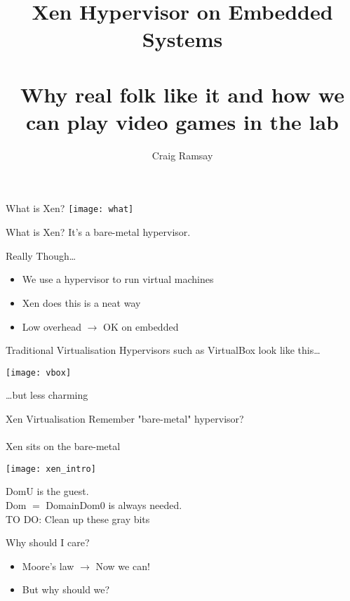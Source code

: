 \documentclass[xelatex]{beamer}
\title{Xen Hypervisor on Embedded Systems\\~\\\normalsize{Why real folk like it and how we can play video games in the lab}}
\author{Craig Ramsay}
\institute{
  Strathclyde University
}
\date{}
\begin{document}
\titleframe[substructure]{\titlepage}

\begin{frame}{What is Xen?}
\centering
\vspace*{1.6cm}
\texttt{[image: what]}
\end{frame}

\begin{frame}[c]{What is Xen?}
\center
\Large
It's a bare-metal hypervisor.
\end{frame}

{
\begin{frame}
\end{frame}
}

\begin{frame}{Really Though\ldots}
\begin{itemize}
\item We use a {\color{blue}hypervisor} to run {\color{green}virtual machines}
\item Xen does this is a neat way
\item Low overhead $\rightarrow$ OK on embedded
\end{itemize}
\end{frame}

\begin{frame}{Traditional Virtualisation}
Hypervisors such as VirtualBox look like this\ldots
\begin{center}
\texttt{[image: vbox]}
\end{center}
\ldots but less charming
\end{frame}

\begin{frame}{Xen Virtualisation}
Remember "bare-metal" hypervisor?
\\~\\Xen sits on the bare-metal
\begin{center}
\texttt{[image: xen\_intro]}
\end{center}
\hfill DomU is the guest.\\
Dom $=$ Domain\hfill Dom0 is always needed.
\\TO DO: Clean up these gray bits
\end{frame}

\begin{frame}{Why should I care?}
\begin{itemize}
\item Moore's law $\rightarrow$ Now we can!
\item But why should we?
\end{itemize}
\centering

\end{frame}
\end{document}
